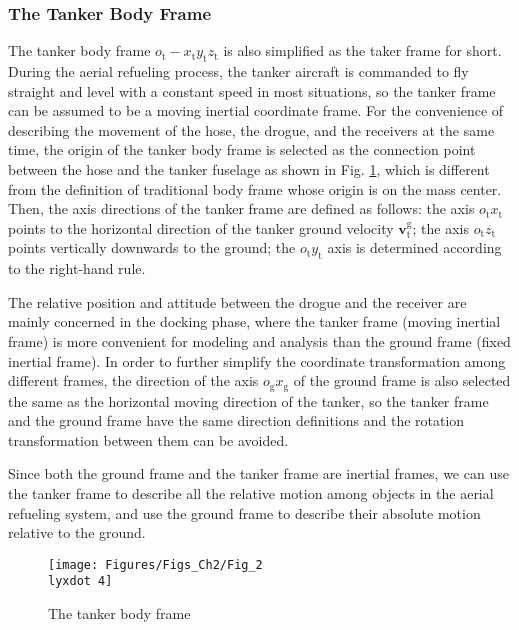 \subsubsection{The Tanker Body Frame}

The tanker body frame ${{o}_{\text{t}}}-{{x}_{\text{t}}}{{y}_{\text{t}}}{{z}_{\text{t}}}$
is also simplified as the taker frame for short. During the aerial
refueling process, the tanker aircraft is commanded to fly straight
and level with a constant speed in most situations, so the tanker
frame can be assumed to be a moving inertial coordinate frame. For
the convenience of describing the movement of the hose, the drogue,
and the receivers at the same time, the origin of the tanker body
frame is selected as the connection point between the hose and the
tanker fuselage as shown in Fig. \ref{Fig_2.4}, which is different
from the definition of traditional body frame whose origin is on the
mass center. Then, the axis directions of the tanker frame are defined
as follows: the axis ${{o}_{\text{t}}}{{x}_{\text{t}}}$ points to
the horizontal direction of the tanker ground velocity $\mathbf{v}_{\text{t}}^{\text{g}}$;
the axis ${{o}_{\text{t}}}{{z}_{\text{t}}}$ points vertically downwards
to the ground; the ${{o}_{\text{t}}}{{y}_{\text{t}}}$ axis is determined
according to the right-hand rule.

The relative position and attitude between the drogue and the receiver
are mainly concerned in the docking phase, where the tanker frame
(moving inertial frame) is more convenient for modeling and analysis
than the ground frame (fixed inertial frame). In order to further
simplify the coordinate transformation among different frames, the
direction of the axis ${{o}_{\text{g}}}{{x}_{\text{g}}}$ of the ground
frame is also selected the same as the horizontal moving direction
of the tanker, so the tanker frame and the ground frame have the same
direction definitions and the rotation transformation between them
can be avoided. 

Since both the ground frame and the tanker frame are inertial frames,
we can use the tanker frame to describe all the relative motion among
objects in the aerial refueling system, and use the ground frame to
describe their absolute motion relative to the ground. 

\begin{figure}
	\begin{centering}
		\texttt{[image: Figures/Figs\_Ch2/Fig\_2\\lyxdot 4]}
		\par\end{centering}
	\caption{The tanker body frame}
	
	\centering{}\label{Fig_2.4}
\end{figure}


